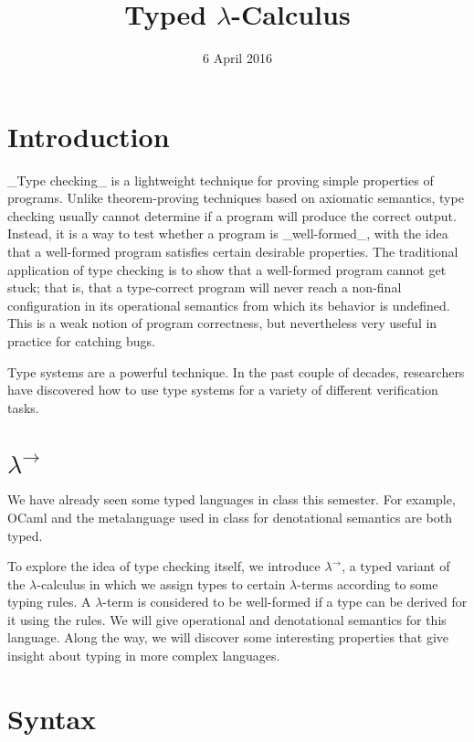 \title{Typed $\lambda$-Calculus}
\date{6 April 2016}

\maketitle

\section{Introduction}

_Type checking_ is a lightweight technique for proving
simple properties of programs. Unlike theorem-proving
techniques based on axiomatic semantics,
type checking usually cannot determine if a program will
produce the correct output. Instead, it is a way to test
whether a program is _well-formed_, with the idea that a
well-formed program satisfies certain desirable
properties. The traditional application of type checking
is to show that a well-formed program cannot get stuck; that is,
that a type-correct program will
never reach a non-final configuration in its operational
semantics from which its behavior is undefined. This is a
weak notion of program correctness, but nevertheless very
useful in practice for catching bugs.

Type systems are a powerful technique. In the past couple
of decades, researchers have discovered how to use type systems
for a variety of different verification tasks.

\section{$\lambda^\to$}

We have already seen some typed languages in class this semester.
For example, OCaml and the metalanguage used in class for denotational
semantics are both typed.

To explore the idea of type checking itself, we introduce
$\lambda^\to$, a typed variant of the $\lambda$-calculus in which
we assign types to certain $\lambda$-terms according to some typing rules.
A $\lambda$-term is considered to be well-formed if a type can
be derived for it using the rules. We will give operational and denotational
semantics for this language. Along the way, we will discover
some interesting properties that give insight about typing in more
complex languages.

\section{Syntax}

